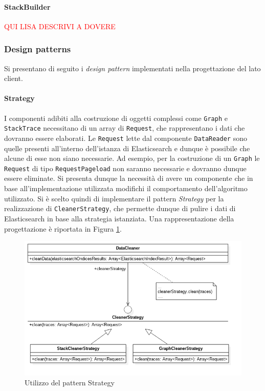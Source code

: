 \paragraph{StackBuilder} \Spazio
\textcolor{red}{QUI LISA DESCRIVI A DOVERE}




\subsubsection{Design patterns}
Si presentano di seguito i \emph{design pattern} implementati nella progettazione del lato client.

\paragraph{Strategy} \Spazio
\label{sec:patternStrategy}
I componenti adibiti alla costruzione di oggetti complessi come \texttt{Graph} e \texttt{StackTrace} necessitano di un array di \texttt{Request}, che rappresentano i dati che dovranno essere elaborati. Le \texttt{Request} lette dal componente \texttt{DataReader} sono quelle presenti all'interno dell'istanza di Elasticsearch e dunque è possibile che alcune di esse non siano necessarie. Ad esempio, per la costruzione di un \texttt{Graph} le \texttt{Request} di tipo \texttt{RequestPageload} non saranno necessarie e dovranno dunque essere eliminate. Si presenta dunque la necessità di avere un componente che in base all'implementazione utilizzata modifichi il comportamento dell'algoritmo utilizzato. Si è scelto quindi di implementare il pattern \emph{Strategy} per la realizzazione di \texttt{CleanerStrategy}, che permette dunque di pulire i dati di Elasticsearch in base alla strategia istanziata. Una rappresentazione della progettazione è riportata in Figura \ref{img:strategy}.

\begin{figure}[h]
	\centering
	\includegraphics[width=1\textwidth]{Images/patternStrategy.png}
	\caption{Utilizzo del pattern Strategy}
	\label{img:strategy}
\end{figure}
 
